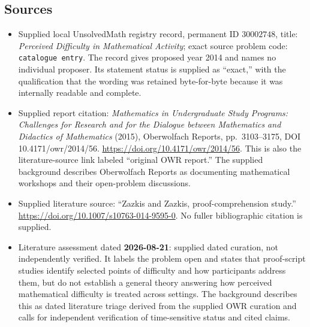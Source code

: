 \documentclass[11pt]{article}
\begin{document}
\subsection{Sources}
\begin{itemize}
\item Supplied local UnsolvedMath registry record, permanent ID \(30002748\), title: \emph{Perceived Difficulty in Mathematical Activity}; exact source problem code: \texttt{catalogue entry}. The record gives proposed year 2014 and names no individual proposer. Its statement status is supplied as ``exact,'' with the qualification that the wording was retained byte-for-byte because it was internally readable and complete.
\item Supplied report citation: \emph{Mathematics in Undergraduate Study Programs: Challenges for Research and for the Dialogue between Mathematics and Didactics of Mathematics} (2015), Oberwolfach Reports, pp.\ 3103--3175, DOI 10.4171/owr/2014/56. \url{https://doi.org/10.4171/owr/2014/56}. This is also the literature-source link labeled ``original OWR report.'' The supplied background describes Oberwolfach Reports as documenting mathematical workshops and their open-problem discussions.
\item Supplied literature source: ``Zazkis and Zazkis, proof-comprehension study.'' \url{https://doi.org/10.1007/s10763-014-9595-0}. No fuller bibliographic citation is supplied.
\item Literature assessment dated \textbf{2026-08-21}: supplied dated curation, not independently verified. It labels the problem open and states that proof-script studies identify selected points of difficulty and how participants address them, but do not establish a general theory answering how perceived mathematical difficulty is treated across settings. The background describes this as dated literature triage derived from the supplied OWR curation and calls for independent verification of time-sensitive status and cited claims.
\end{itemize}
\end{document}
